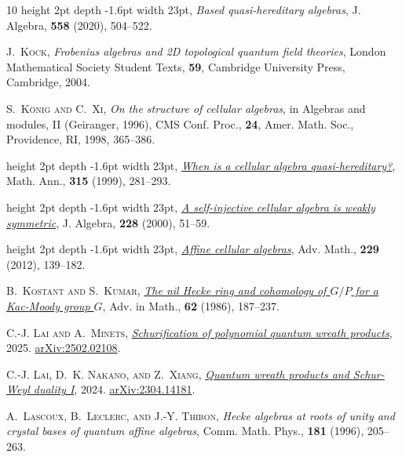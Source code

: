 \documentclass[a4paper,11pt]{amsart}
\numberwithin{equation}{subsection}
\theoremstyle{definition}
\theoremstyle{theorem}
\theoremstyle{remark}
\begin{document}
\begin{thebibliography}{10}
\leavevmode\vrule height 2pt depth -1.6pt width 23pt, \textit{Based
  quasi-hereditary algebras}, J. Algebra, \textbf{558} (2020), 504--522.

\textsc{J.~Kock}, \textit{Frobenius algebras and 2{D} topological quantum field
  theories}, London Mathematical Society Student Texts, \textbf{59}, Cambridge
  University Press, Cambridge, 2004.

\textsc{S.~K{\"o}nig and C.~Xi}, \textit{On the structure of cellular
  algebras}, in Algebras and modules, {II} ({G}eiranger, 1996), CMS Conf.
  Proc., \textbf{24}, Amer. Math. Soc., Providence, RI, 1998, 365--386.

\leavevmode\vrule height 2pt depth -1.6pt width 23pt,
  \href{http://dx.doi.org/10.1007/s002080050368}{\textit{When is a cellular
  algebra quasi-hereditary?}}, Math. Ann., \textbf{315} (1999), 281--293.

\leavevmode\vrule height 2pt depth -1.6pt width 23pt,
  \href{http://dx.doi.org/10.1006/jabr.1999.8037}{\textit{A self-injective
  cellular algebra is weakly symmetric}}, J. Algebra, \textbf{228} (2000),
  51--59.

\leavevmode\vrule height 2pt depth -1.6pt width 23pt,
  \href{http://dx.doi.org/10.1016/j.aim.2011.08.010}{\textit{Affine cellular
  algebras}}, Adv. Math., \textbf{229} (2012), 139--182.

\textsc{B.~Kostant and S.~Kumar},
  \href{http://dx.doi.org/10.1016/0001-8708(86)90101-5}{\textit{The nil {H}ecke
  ring and cohomology of {$G/P$} for a {K}ac-{M}oody group {$G$}}}, Adv. in
  Math., \textbf{62} (1986), 187--237.

\textsc{C.-J. Lai and A.~Minets},
  \href{https://arxiv.org/abs/2502.02108}{\textit{Schurification of polynomial
  quantum wreath products}}, 2025.
\newblock \href{http://arxiv.org/abs/2502.02108}{arXiv:2502.02108}.

\textsc{C.-J. Lai, D.~K. Nakano, and Z.~Xiang},
  \href{https://arxiv.org/abs/2304.14181}{\textit{Quantum wreath products and
  {S}chur-Weyl duality I}}, 2024.
\newblock \href{http://arxiv.org/abs/2304.14181}{arXiv:2304.14181}.

\textsc{A.~Lascoux, B.~Leclerc, and J.-Y. Thibon}, \textit{Hecke algebras at
  roots of unity and crystal bases of quantum affine algebras}, Comm. Math.
  Phys., \textbf{181} (1996), 205--263.


\end{thebibliography}
\end{document}
